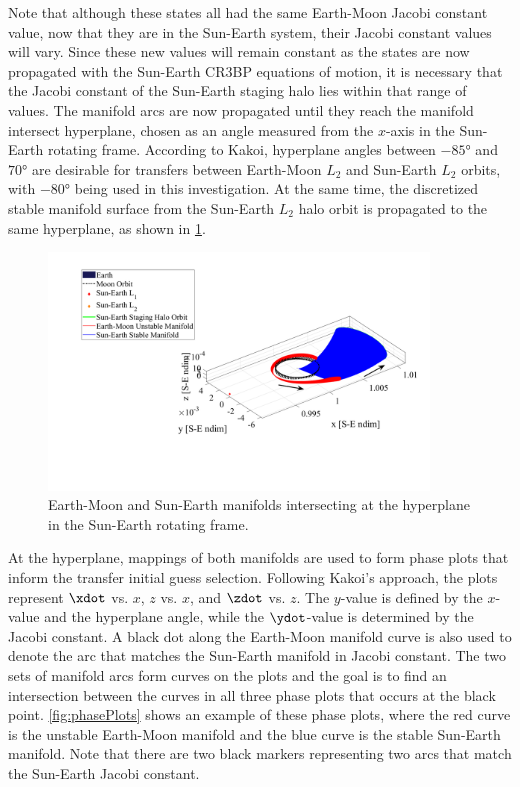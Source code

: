 Note that although these states all had the same Earth-Moon Jacobi constant
value, now that they are in the Sun-Earth system, their Jacobi constant values will vary. Since
these new values will remain constant as the states are now propagated with the Sun-Earth CR3BP
equations of motion, it is necessary that the Jacobi constant of the Sun-Earth staging halo lies
within that range of values. The manifold arcs are now propagated until they reach the manifold
intersect hyperplane, chosen as an angle measured from the $x$-axis in the Sun-Earth rotating
frame. According to Kakoi, hyperplane angles between $-\ang{85}$ and $\ang{70}$ are desirable for
transfers between Earth-Moon $L_{2}$ and Sun-Earth $L_{2}$ orbits, with $\ang{-80}$ being used in
this investigation\cite{Kakoi:2015}. At the same time, the discretized stable manifold surface from
the Sun-Earth $L_{2}$ halo orbit is propagated to the same hyperplane, as shown in
\cref{fig:hyperplane}.

\begin{figure}[ht]
    \centering
    \includegraphics[width=0.9\textwidth]{figures/Hyperplane.pdf}
    \caption{Earth-Moon and Sun-Earth manifolds intersecting at the hyperplane in the Sun-Earth rotating frame.}
    \label{fig:hyperplane}
\end{figure}

At the hyperplane, mappings of both manifolds are used to form phase plots that inform the transfer
initial guess selection. Following Kakoi's approach, the plots represent $\xdot$ vs. $x$, $z$ vs.
$x$, and $\zdot$ vs. $z$. The $y$-value is defined by the $x$-value and the hyperplane angle, while
the $\ydot$-value is determined by the Jacobi constant\cite{Kakoi:2015}. A black dot along the
Earth-Moon manifold curve is also used to denote the arc that matches the Sun-Earth manifold in
Jacobi constant. The two sets of manifold arcs form curves on the plots and the goal is to find an
intersection between the curves in all three phase plots that occurs at the black point.
\cref{fig:phasePlots} shows an example of these phase plots, where the red curve is the unstable
Earth-Moon manifold and the blue curve is the stable Sun-Earth manifold. Note that there are two
black markers representing two arcs that match the Sun-Earth Jacobi constant.

